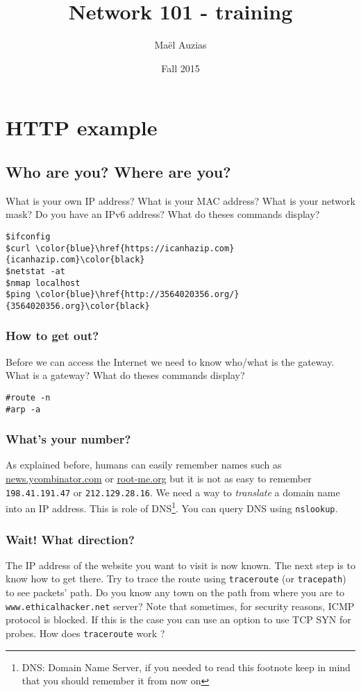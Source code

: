 \documentclass[11pt]{article}
\begin{document}
\title{Network 101 - training}
\date{Fall 2015}
\author{Maël Auzias}
\maketitle

\tableofcontents
\pagebreak


\section{HTTP example}
\subsection{Who are you? Where are you?}
What is your own IP address? What is your MAC address? What is your network mask? Do you have an IPv6 address?
What do theses commands display?
\begin{verbatim}
$ifconfig
$curl \color{blue}\href{https://icanhazip.com}{icanhazip.com}\color{black}
$netstat -at
$nmap localhost
$ping \color{blue}\href{http://3564020356.org/}{3564020356.org}\color{black}
\end{verbatim}

\subsubsection{How to get out?}
Before we can access the Internet we need to know who/what is the gateway. What is a gateway?
What do theses commands display?
\begin{verbatim}
#route -n
#arp -a
\end{verbatim}

\subsubsection{What's your number?}
As explained before, humans can easily remember names such as \color{blue}\href{https://news.ycombinator.com}{news.ycombinator.com}\color{black} or \color{blue}\href{http://root-me.org}{root-me.org}\color{black} but it is not as easy to remember \verb"198.41.191.47" or \verb"212.129.28.16". We need a way to \emph{translate} a domain name into an IP address. This is role of DNS\footnote{DNS: Domain Name Server, if you needed to read this footnote keep in mind that you should remember it from now on}. You can query DNS using \verb"nslookup".

\subsubsection{Wait! What direction?}
The IP address of the website you want to visit is now known. The next step is to know how to get there. Try to trace the route using \verb"traceroute" (or \verb"tracepath") to see packets' path. Do you know any town on the path from where you are to \verb"www.ethicalhacker.net" server?
Note that sometimes, for security reasons, ICMP protocol is blocked. If this is the case you can use an option to use TCP SYN for probes.
How does \verb"traceroute" work ?
\end{document}
